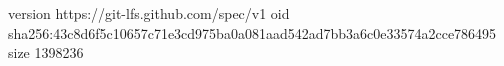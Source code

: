 version https://git-lfs.github.com/spec/v1
oid sha256:43c8d6f5c10657c71e3cd975ba0a081aad542ad7bb3a6c0e33574a2cce786495
size 1398236
